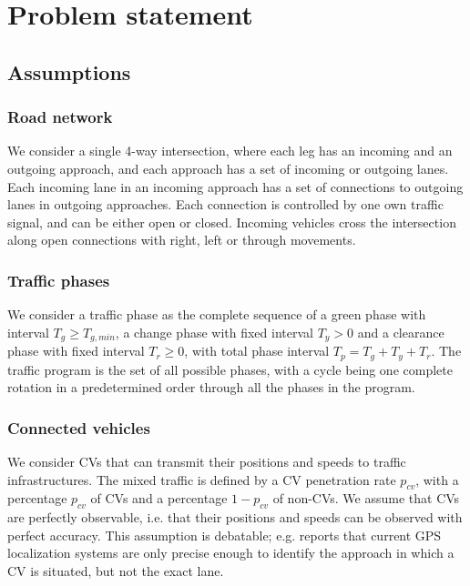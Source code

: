 \documentclass[journal]{IEEEtran}
\begin{document}
\section{Problem statement}
\label{sec:problem}

\subsection{Assumptions}

\subsubsection{Road network} 
We consider a single 4-way intersection, where each leg has an incoming and an outgoing approach, and each approach has a set of incoming or outgoing lanes. Each incoming lane in an incoming approach has a set of connections to outgoing lanes in outgoing approaches. Each connection is controlled by one own traffic signal, and can be either open or closed. Incoming vehicles cross the intersection along open connections with right, left or through movements. \\

\subsubsection{Traffic phases} 
We consider a traffic phase as the complete sequence of a green phase with interval $T_g \geq T_{g,min}$, a change phase with fixed interval $T_y > 0$ and a clearance phase with fixed interval $T_r \geq 0$, with total phase interval $T_p = T_g + T_y + T_r$. The traffic program is the set of all possible phases, with a cycle being one complete rotation in a predetermined order through all the phases in the program. \\

\subsubsection{Connected vehicles} 
We consider CVs that can transmit their positions and speeds to traffic infrastructures. The mixed traffic is defined by a CV penetration rate $p_{cv}$, with a percentage $p_{cv}$ of CVs and a percentage $1-p_{cv}$ of non-CVs. We assume that CVs are perfectly observable, i.e. that their positions and speeds can be observed with perfect accuracy. This assumption is debatable; e.g. \cite{nguyen2020estimation} reports that current GPS localization systems are only precise enough to identify the approach in which a CV is situated, but not the exact lane.
\end{document}
